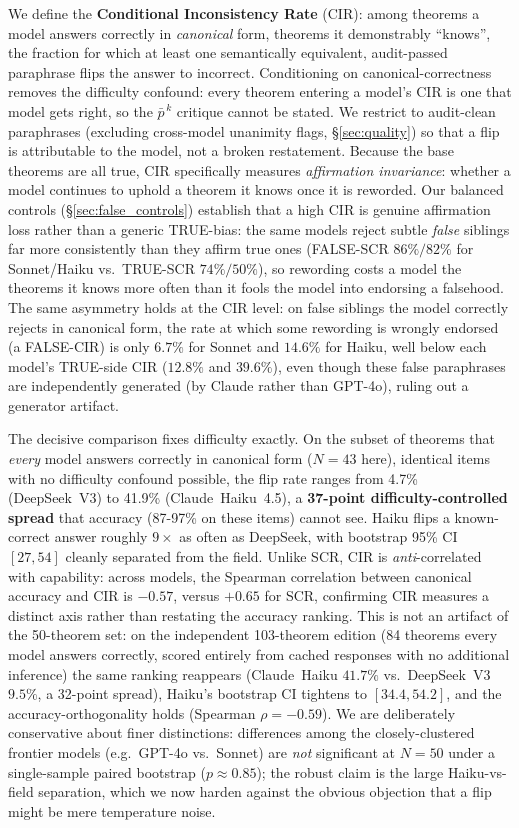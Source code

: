 \documentclass{article}
\begin{document}
We define the \textbf{Conditional Inconsistency Rate} (CIR): among theorems a model answers correctly in \emph{canonical} form, theorems it demonstrably ``knows'', the fraction for which at least one semantically equivalent, audit-passed paraphrase flips the answer to incorrect. Conditioning on canonical-correctness removes the difficulty confound: every theorem entering a model's CIR is one that model gets right, so the $\bar p^{\,k}$ critique cannot be stated. We restrict to audit-clean paraphrases (excluding cross-model unanimity flags, \S\ref{sec:quality}) so that a flip is attributable to the model, not a broken restatement. Because the base theorems are all true, CIR specifically measures \emph{affirmation invariance}: whether a model continues to uphold a theorem it knows once it is reworded. Our balanced controls (\S\ref{sec:false_controls}) establish that a high CIR is genuine affirmation loss rather than a generic TRUE-bias: the same models reject subtle \emph{false} siblings far more consistently than they affirm true ones (FALSE-SCR $86\%/82\%$ for Sonnet/Haiku vs.\ TRUE-SCR $74\%/50\%$), so rewording costs a model the theorems it knows more often than it fools the model into endorsing a falsehood. The same asymmetry holds at the CIR level: on false siblings the model correctly rejects in canonical form, the rate at which some rewording is wrongly endorsed (a FALSE-CIR) is only $6.7\%$ for Sonnet and $14.6\%$ for Haiku, well below each model's TRUE-side CIR ($12.8\%$ and $39.6\%$), even though these false paraphrases are independently generated (by Claude rather than GPT-4o), ruling out a generator artifact.

The decisive comparison fixes difficulty exactly. On the subset of theorems that \emph{every} model answers correctly in canonical form ($N{=}43$ here), identical items with no difficulty confound possible, the flip rate ranges from 4.7\% (DeepSeek~V3) to 41.9\% (Claude~Haiku~4.5), a \textbf{37-point difficulty-controlled spread} that accuracy (87-97\% on these items) cannot see. Haiku flips a known-correct answer roughly $9\times$ as often as DeepSeek, with bootstrap 95\% CI $[27,54]$ cleanly separated from the field. Unlike SCR, CIR is \emph{anti}-correlated with capability: across models, the Spearman correlation between canonical accuracy and CIR is $-0.57$, versus $+0.65$ for SCR, confirming CIR measures a distinct axis rather than restating the accuracy ranking. This is not an artifact of the 50-theorem set: on the independent 103-theorem edition (84 theorems every model answers correctly, scored entirely from cached responses with no additional inference) the same ranking reappears (Claude~Haiku $41.7\%$ vs.\ DeepSeek~V3 $9.5\%$, a 32-point spread), Haiku's bootstrap CI tightens to $[34.4,54.2]$, and the accuracy-orthogonality holds (Spearman $\rho=-0.59$). We are deliberately conservative about finer distinctions: differences among the closely-clustered frontier models (e.g.\ GPT-4o vs.\ Sonnet) are \emph{not} significant at $N{=}50$ under a single-sample paired bootstrap ($p\approx0.85$); the robust claim is the large Haiku-vs-field separation, which we now harden against the obvious objection that a flip might be mere temperature noise.
\end{document}
